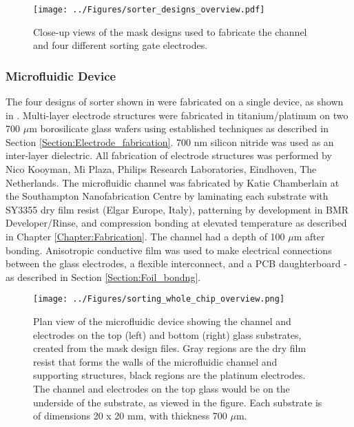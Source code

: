 \begin{figure}
 \centering
 \texttt{[image: ../Figures/sorter\_designs\_overview.pdf]}
 \caption[Overview of the four different sorting gate electrodes.]{Close-up views of the mask designs used to fabricate the channel and four different sorting gate electrodes.}
 \label{fig:sorter_designs_overview}
\end{figure}

\subsubsection{Microfluidic Device}

The four designs of sorter shown in  were fabricated on a single device, as shown in . Multi-layer electrode structures were fabricated in titanium/platinum on two 700 $\mu$m borosilicate glass wafers using established techniques as described in Section \ref{Section:Electrode_fabrication}. 700 nm silicon nitride was used as an inter-layer dielectric. All fabrication of electrode structures was performed by Nico Kooyman, Mi Plaza, Philips Research Laboratories, Eindhoven, The Netherlands. The microfluidic channel was fabricated by Katie Chamberlain at the Southampton Nanofabrication Centre by laminating each substrate with SY3355 dry film resist (Elgar Europe, Italy), patterning by development in BMR Developer/Rinse, and compression bonding at elevated temperature as described in Chapter \ref{Chapter:Fabrication}. The channel had a depth of 100 $\mu$m after bonding. Anisotropic conductive film was used to make electrical connections between the glass electrodes, a flexible interconnect, and a PCB daughterboard - as described in Section \ref{Section:Foil_bondng}. 

\begin{figure}
 \centering
 \texttt{[image: ../Figures/sorting\_whole\_chip\_overview.png]}
 \caption[Plan view of the microfluidic device and the four different sets of sorting electrodes.]{Plan view of the microfluidic device showing the channel and electrodes on the top (left) and bottom (right) glass substrates, created from the mask design files. Gray regions are the dry film resist that forms the walls of the microfluidic channel and supporting structures, black regions are the platinum electrodes. The channel and electrodes on the top glass would be on the underside of the substrate, as viewed in the figure. Each substrate is of dimensions 20 x 20 mm, with thickness 700 $\mu$m.}
 \label{fig:sorting_whole_chip_overview}
\end{figure}



